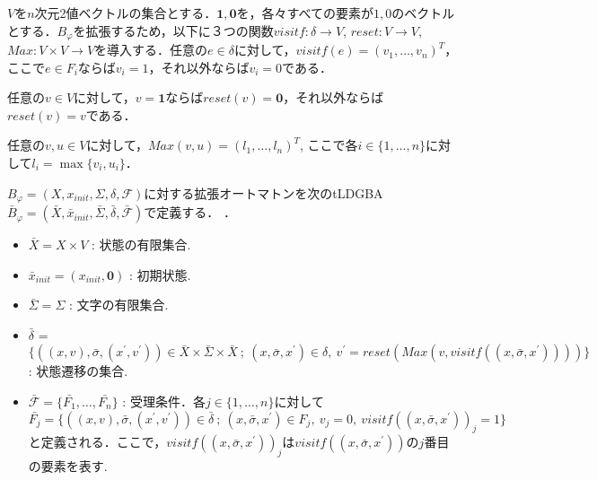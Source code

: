 \documentclass[a4j,9pt,twocolumn]{jsarticle}
\theoremstyle{definition}
\begin{document}
$V$を$n$次元2値ベクトルの集合とする．$\bm{1},\bm{0}$を，各々すべての要素が$1,0$のベクトルとする．$B_{\varphi}$を拡張するため，以下に３つの関数$visitf: \delta \to V$, $reset:V \to V$, $Max:V \times V \to V$を導入する．任意の$e \in \delta$に対して，$visitf(e) = (v_1,\ldots,v_n)^T$，ここで$e\in F_i$ならば$v_i = 1$，それ以外ならば$v_i = 0$である．
\begin{comment}
\begin{align}
 v_i =
  \left\{
  \begin{aligned}
    1 &   & &\text{if}\ e\in F_i, \\
    0 &   & &\text{otherwise}.
  \end{aligned}
  \right. \nonumber
\end{align}
\end{comment}
任意の$v \in V$に対して，$v = \bm{1}$ならば$reset(v) = \bm{0}$，それ以外ならば$reset(v) = v$である．
\begin{comment}
\begin{align}
  reset(v) =
  \left\{
  \begin{aligned}
    \bm{0} &   & &\text{if}\  v = \bm{1},\\
    v &   & &\text{otherwise}.
  \end{aligned}
  \right. \nonumber
\end{align}
\end{comment}
任意の$v,u \in V$に対して，$Max(v,u) = (l_1, \ldots, l_n)^T$, ここで各$i \in \{ 1,\dots, n \}$に対して$l_i = \max \{ v_i, u_i \}$．

$B_\varphi = (X,x_{init},\Sigma,\delta,\mathcal{F})$に対する拡張オートマトンを次のtLDGBA $\bar{B}_{\varphi} = (\bar{X},\bar{x}_{init},\bar{\Sigma},\bar{\delta},\bar{\mathcal{F}})$で定義する．
．
\begin{itemize}
  \item $\bar{X} = X \times V$ : 状態の有限集合.
  \item $\bar{x}_{init} = (x_{init}, \bm{0})$ : 初期状態.
  \item $\bar{\Sigma} = \Sigma$ : 文字の有限集合.
  \item $\bar{\delta}$ = $\{ ((x,v), \bar{\sigma}, (x^{\prime},v^{\prime})) \in \bar{X} \times \bar{\Sigma} \times \bar{X}\ ;\ (x,\bar{\sigma},x^{\prime}) \in \delta,\ v^{\prime} = reset(Max(v,visitf((x,\bar{\sigma},x^{\prime})))) \}$: 状態遷移の集合.
  \item $\mathcal{\bar{F}} = \{ \bar{F_1}, \ldots ,\bar{F_n} \}$ : 受理条件．各$j \in \{ 1,\ldots,n \}$に対して$\bar{F_j} = \{ ((x,v), \bar{\sigma}, (x^{\prime},v^{\prime})) \in \bar{\delta}\ ;\ (x, \bar{\sigma}, x^{\prime}) \in F_j,\ v_j = 0,\ visitf((x, \bar{\sigma}, x^{\prime}))_j = 1\}$と定義される．ここで，$visitf((x, \bar{\sigma}, x^{\prime}))_j$は$visitf((x, \bar{\sigma}, x^{\prime}))$の$j$番目の要素を表す.
\end{itemize}
\end{document}

